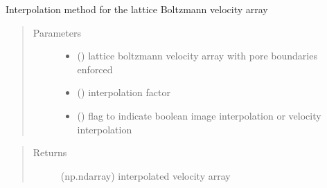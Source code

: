 \documentclass[letterpaper,10pt,english]{sphinxmanual}
\begin{document}

\begin{fulllineitems}
\label{\detokenize{index:lb_colloids.Colloids.Colloid_Setup.InterpV}}
Interpolation method for the lattice Boltzmann velocity array
\begin{quote}\begin{description}
\item[{Parameters}] \leavevmode\begin{itemize}
\item {} 
 () \textendash{} lattice boltzmann velocity array with pore boundaries enforced

\item {} 
 () \textendash{} interpolation factor

\item {} 
 () \textendash{} flag to indicate boolean image interpolation or velocity interpolation

\end{itemize}

\end{description}\end{quote}
\begin{quote}\begin{description}
\item[{Returns}] \leavevmode
(np.ndarray) interpolated velocity array

\end{description}\end{quote}

\end{fulllineitems}

\end{document}

